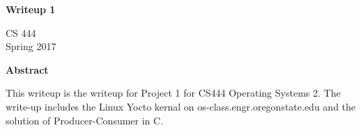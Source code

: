 \documentclass[letterpaper,10pt,titlepage]{article}
\begin{document}
\begin{titlepage}
    \begin{center}
        \vspace*{3.5cm}

        \textbf{Writeup 1}

        \vspace{0.5cm}
	
	\vspace{0.8cm}

        CS 444\\
        Spring 2017\\

        \vspace{1cm}

        \textbf{Abstract}\\

        \vspace{0.5cm}

	This writeup is the writeup for Project 1 for CS444 Operating Systems 2.  The write-up includes the Linux Yocto kernal on os-class.engr.oregonstate.edu and the solution of Producer-Consumer in C.

        \vfill

    \end{center}
\end{titlepage}

\newpage

\tableofcontents

\newpage
\end{document}
